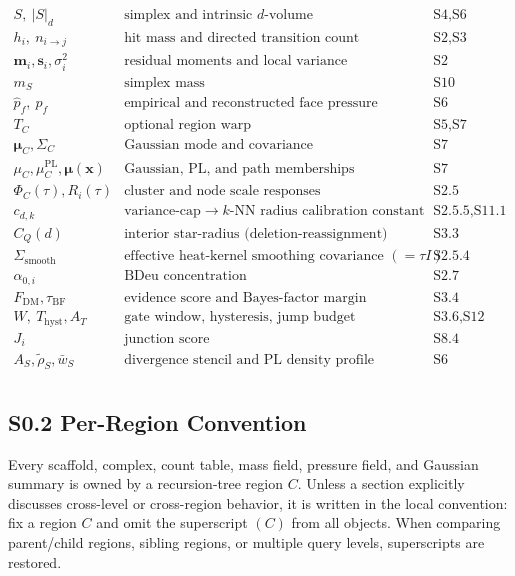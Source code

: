 \documentclass[11pt]{article}
\begin{document}
\[\begin{array}{lll}
S,\ |S|_d & \text{simplex and intrinsic }d\text{-volume} & \text{S4,S6}\\
h_i,\ n_{i\to j} & \text{hit mass and directed transition count} & \text{S2,S3}\\
\mathbf m_i,\mathbf s_i,\sigma_i^2 & \text{residual moments and local variance} & \text{S2}\\
m_S & \text{simplex mass} & \text{S10}\\
\hat p_f,\ p_f & \text{empirical and reconstructed face pressure} & \text{S6}\\
T_C & \text{optional region warp} & \text{S5,S7}\\
\boldsymbol\mu_C,\Sigma_C & \text{Gaussian mode and covariance} & \text{S7}\\
\mu_C,\mu_C^{\mathrm{PL}},\boldsymbol\mu(\mathbf x) & \text{Gaussian, PL, and path memberships} & \text{S7}\\
\Phi_C(\tau),R_i(\tau) & \text{cluster and node scale responses} & \text{S2.5}\\
c_{d,k} & \text{variance-cap}\to k\text{-NN radius calibration constant} & \text{S2.5.5,S11.1}\\
C_Q(d) & \text{interior star-radius (deletion-reassignment) calibration constant} & \text{S3.3}\\
\Sigma_{\mathrm{smooth}} & \text{effective heat-kernel smoothing covariance }(=\tau I) & \text{S2.5.4}\\
\alpha_{0,i} & \text{BDeu concentration} & \text{S2.7}\\
F_{\mathrm{DM}},\tau_{\mathrm{BF}} & \text{evidence score and Bayes-factor margin} & \text{S3.4}\\
W,\ T_{\mathrm{hyst}},A_T & \text{gate window, hysteresis, jump budget} & \text{S3.6,S12}\\
J_i & \text{junction score} & \text{S8.4}\\
A_S,\widetilde\rho_S,\bar w_S & \text{divergence stencil and PL density profile} & \text{S6}\\
\end{array}
\]

\subsection*{S0.2 Per-Region Convention}
Every scaffold, complex, count table, mass field, pressure field, and Gaussian summary is owned by a recursion-tree region $C$. Unless a section explicitly discusses cross-level or cross-region behavior, it is written in the local convention: fix a region $C$ and omit the superscript $(C)$ from all objects. When comparing parent/child regions, sibling regions, or multiple query levels, superscripts are restored.
\end{document}
